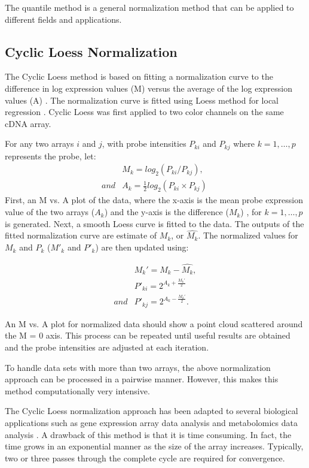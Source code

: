 The quantile method is a general normalization method that can be applied to different fields and applications. 



\subsection{ Cyclic Loess Normalization}
The Cyclic Loess method \cite{dudoit2} is based on fitting a normalization curve to the difference in log expression values (M) versus the average of the log expression values (A) \cite{dudoit} . The normalization curve is fitted using Loess method for local regression \cite{clevland}. Cyclic Loess was first applied to two color channels on the same cDNA array.

For any two arrays $i$ and $j$, with probe intensities $P_{ki}$ and $P_{kj}$ where $k=1, \ldots ,p$ represents the probe, let:
\begin{eqnarray}
& M_k = log_2(P_{ki}/P_{kj}), \\
and &  A_k = \frac{1}{2} log_2(P_{ki} \times P_{kj}) \ 
\end{eqnarray} 
First, an M vs. A plot of the data, where the x-axis is the mean probe expression value of the two arrays ($A_k$) and the y-axis is the difference ($ M_k$) , for $k=1, \ldots ,p$ is generated. 
Next, a smooth Loess curve is fitted to the data.
The outputs of the fitted normalization curve are estimate of $ M_k$, or $\hat{M_k}$. The normalized values for $M_k$ and $P_k$ ($M'_k$ and $P'_k$) are then updated using:

\begin{eqnarray}
& M_k'=M_k - \hat{M_k} , \\
& P'_{ki}= 2^{A_k+\frac{M_k'}{2}} \\
and & P'_{kj}= 2^{A_k-\frac{M_k'}{2}} .
\end{eqnarray} 

An M vs. A plot for normalized data should show a point cloud scattered around the M = 0 axis.  This process can be repeated until useful results are obtained and the probe intensities are adjusted at each iteration.

To handle data sets with  more than two arrays, the above normalization approach can be processed in a pairwise manner. However, this makes this method computationally very intensive.

The Cyclic Loess normalization approach has been adapted to several biological applications such as gene expression array data analysis \cite{ballman}  \cite{hochreiter} and metabolomics data analysis \cite{li}.
A drawback of this method is that it is time consuming. In fact, the time grows in an exponential manner as the size of the array increases. Typically, two or three passes through the complete cycle are required for convergence. 

